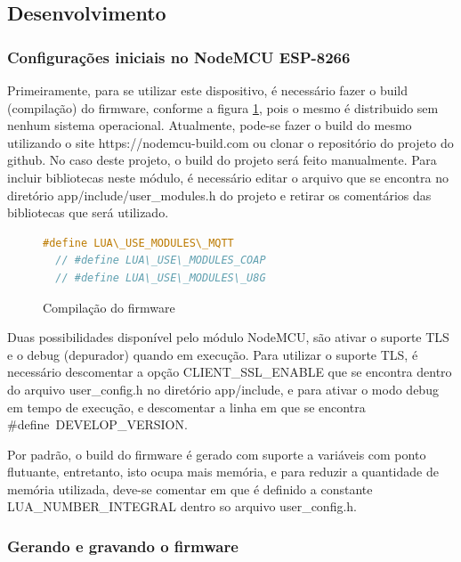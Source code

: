 \documentclass[journal]{IEEEtran}
\begin{document}


\subsection{Desenvolvimento}
\subsubsection{Configurações iniciais no NodeMCU ESP-8266}
Primeiramente, para se utilizar este dispositivo, é necessário fazer o build (compilação) do firmware, conforme a figura \ref{alg:modulesh}, pois o mesmo é distribuido sem nenhum sistema operacional. Atualmente, pode-se fazer o build do mesmo utilizando o site https://nodemcu-build.com ou clonar o repositório do projeto do github. No caso deste projeto, o build do projeto será feito manualmente. Para incluir bibliotecas neste módulo, é necessário editar o arquivo que se encontra no diretório app/include/user\_modules.h do projeto e retirar os comentários das bibliotecas que será utilizado.

\begin{figure}[h]
\centering

\begin{lstlisting}[language=C]
  #define LUA\_USE_MODULES\_MQTT
  // #define LUA\_USE\_MODULES_COAP
  // #define LUA\_USE\_MODULES\_U8G
\end{lstlisting}

\caption{Compilação do firmware}
\label{alg:modulesh}
\end{figure}

Duas possibilidades disponível pelo módulo NodeMCU, são ativar o suporte TLS e o debug (depurador) quando em execução. Para utilizar o suporte TLS, é necessário descomentar a opção CLIENT\_SSL\_ENABLE que se encontra dentro do arquivo user\_config.h no diretório app/include, e para ativar o modo debug em tempo de execução, e descomentar a linha em que se encontra \#define\ DEVELOP\_VERSION.

Por padrão, o build do firmware é gerado com suporte a variáveis com ponto flutuante, entretanto, isto ocupa mais memória, e para reduzir a quantidade de memória utilizada, deve-se comentar em que é definido a constante LUA\_NUMBER\_INTEGRAL dentro so arquivo user\_config.h.

\subsubsection{Gerando e gravando o firmware}
\end{document}

